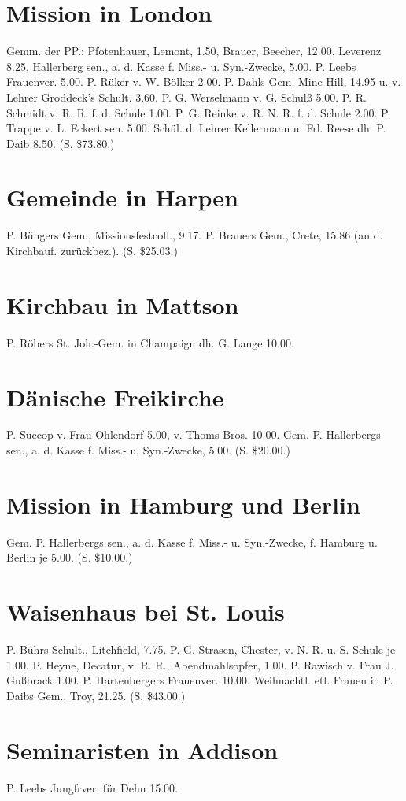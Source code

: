 \section{Mission in London}
Gemm. der PP.: Pfotenhauer, Lemont, 1.50, Brauer, Beecher, 12.00, Leverenz 8.25, Hallerberg sen., a. d. Kasse f. Miss.- u. Syn.-Zwecke, 5.00. P. Leebs Frauenver. 5.00. P. Rüker v. W. Bölker 2.00. P. Dahls Gem. Mine Hill, 14.95 u. v. Lehrer Groddeck’s Schult. 3.60. P. G. Werselmann v. G. Schulß 5.00. P. R. Schmidt v. R. R. f. d. Schule 1.00. P. G. Reinke v. R. N. R. f. d. Schule 2.00. P. Trappe v. L. Eckert sen. 5.00. Schül. d. Lehrer Kellermann u. Frl. Reese dh. P. Daib 8.50. (S. \$73.80.)

\section{Gemeinde in Harpen}
P. Büngers Gem., Missionsfestcoll., 9.17. P. Brauers Gem., Crete, 15.86 (an d. Kirchbauf. zurückbez.). (S. \$25.03.)

\section{Kirchbau in Mattson}
P. Röbers St. Joh.-Gem. in Champaign dh. G. Lange 10.00.

\section{Dänische Freikirche}
P. Succop v. Frau Ohlendorf 5.00, v. Thoms Bros. 10.00. Gem. P. Hallerbergs sen., a. d. Kasse f. Miss.- u. Syn.-Zwecke, 5.00. (S. \$20.00.)

\section{Mission in Hamburg und Berlin}
Gem. P. Hallerbergs sen., a. d. Kasse f. Miss.- u. Syn.-Zwecke, f. Hamburg u. Berlin je 5.00. (S. \$10.00.)

\section{Waisenhaus bei St. Louis}
P. Bührs Schult., Litchfield, 7.75. P. G. Strasen, Chester, v. N. R. u. S. Schule je 1.00. P. Heyne, Decatur, v. R. R., Abendmahlsopfer, 1.00. P. Rawisch v. Frau J. Gußbrack 1.00. P. Hartenbergers Frauenver. 10.00. Weihnachtl. etl. Frauen in P. Daibs Gem., Troy, 21.25. (S. \$43.00.)

\section{Seminaristen in Addison}
P. Leebs Jungfrver. für Dehn 15.00.


